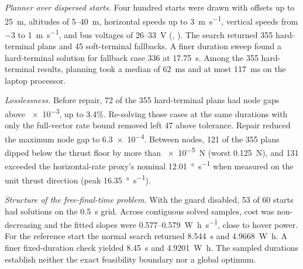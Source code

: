 \documentclass[10pt,letterpaper]{article}
\begin{document}
\textit{Planner over dispersed starts.}
Four hundred starts were drawn with offsets up to \SI{25}{\metre}, altitudes of 5--\SI{40}{\metre}, horizontal speeds up to \SI{3}{\metre\per\second}, vertical speeds from \SI{-3}{} to \SI{+1}{\metre\per\second}, and bus voltages of 26--\SI{33}{\volt} (, ).
The search returned 355 hard-terminal plans and 45 soft-terminal fallbacks. A finer duration sweep found a hard-terminal solution for fallback case 336 at \SI{17.75}{\second}.
Among the 355 hard-terminal results, planning took a median of \SI{62}{\milli\second} and at most \SI{117}{\milli\second} on the laptop processor.

\textit{Losslessness.}
Before repair, 72 of the 355 hard-terminal plans had node gaps above \num{e-3}, up to 3.4\%.
Re-solving those cases at the same durations with only the full-vector rate bound removed left 47 above tolerance.
Repair reduced the maximum node gap to \num{6.3e-4}. Between nodes, 121 of the 355 plans dipped below the thrust floor by more than \SI{e-5}{\newton} (worst \SI{0.125}{\newton}), and 131 exceeded the horizontal-rate proxy's nominal \SI{12.01}{\degree\per\second} when measured on the unit thrust direction (peak \SI{16.35}{\degree\per\second}).

\textit{Structure of the free-final-time problem.}
With the guard disabled, 53 of 60 starts had solutions on the \SI{0.5}{\second} grid. Across contiguous solved samples, cost was non-decreasing and the fitted slopes were 0.577--\SI{0.579}{\watt\hour\per\second}, close to hover power.
For the reference start the normal search returned \SI{8.544}{\second} and \SI{4.9668}{\watt\hour}. A finer fixed-duration check yielded \SI{8.45}{\second} and \SI{4.9201}{\watt\hour}. The sampled durations establish neither the exact feasibility boundary nor a global optimum.
\end{document}
